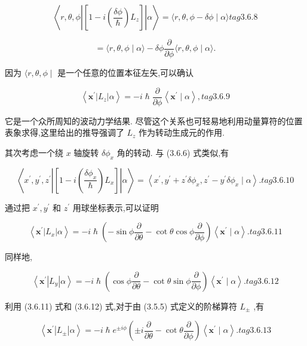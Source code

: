 $$
\left\langle {r,\theta ,\phi \left| \left\lbrack {1 - i\left( \frac{\delta \phi }{\hslash }\right) {L}_{z}}\right\rbrack \right| \alpha }\right\rangle = \langle r,\theta ,\phi - {\delta \phi } \mid \alpha \rangle tag{3.6.8}
$$

$$
= \langle r,\theta ,\phi \mid \alpha \rangle - {\delta \phi }\frac{\partial }{\partial \phi }\langle r,\theta ,\phi \mid \alpha \rangle .
$$

因为 $\langle r,\theta ,\phi \mid$ 是一个任意的位置本征左矢,可以确认

$$
\left\langle {{\mathbf{x}}^{\prime }\left| {L}_{z}\right| \alpha }\right\rangle = - i\hslash \frac{\partial }{\partial \phi }\left\langle {{\mathbf{x}}^{\prime } \mid \alpha }\right\rangle , tag{3.6.9}
$$

它是一个众所周知的波动力学结果. 尽管这个关系也可轻易地利用动量算符的位置表象求得,这里给出的推导强调了 ${L}_{z}$ 作为转动生成元的作用.

其次考虑一个绕 $x$ 轴旋转 $\delta {\phi }_{x}$ 角的转动. 与 (3.6.6) 式类似,有

$$
\left\langle {{x}^{\prime },{y}^{\prime },{z}^{\prime }\left| \left\lbrack {1 - i\left( \frac{\delta {\phi }_{x}}{\hslash }\right) {L}_{x}}\right\rbrack \right| \alpha }\right\rangle = \left\langle {{x}^{\prime },{y}^{\prime } + {z}^{\prime }\delta {\phi }_{x},{z}^{\prime } - {y}^{\prime }\delta {\phi }_{x} \mid \alpha }\right\rangle . tag{3. 6.10}
$$

通过把 ${x}^{\prime },{y}^{\prime }$ 和 ${z}^{\prime }$ 用球坐标表示,可以证明

$$
\left\langle {{\mathbf{x}}^{\prime }\left| {L}_{x}\right| \alpha }\right\rangle = - i\hslash \left( {-\sin \phi \frac{\partial }{\partial \theta } - \cot \theta \cos \phi \frac{\partial }{\partial \phi }}\right) \left\langle {{\mathbf{x}}^{\prime } \mid \alpha }\right\rangle . tag{3. 6.11}
$$

同样地,

$$
\left\langle {{\mathbf{x}}^{\prime }\left| {L}_{y}\right| \alpha }\right\rangle = - i\hslash \left( {\cos \phi \frac{\partial }{\partial \theta } - \cot \theta \sin \phi \frac{\partial }{\partial \phi }}\right) \left\langle {{\mathbf{x}}^{\prime } \mid \alpha }\right\rangle . tag{3. 6.12}
$$

利用 (3.6.11) 式和 (3.6.12) 式,对于由 (3.5.5) 式定义的阶梯算符 ${L}_{ \pm }$ ,有

$$
\left\langle {{\mathbf{x}}^{\prime }\left| {L}_{ \pm }\right| \alpha }\right\rangle = - i\hslash {e}^{\pm {i\phi }}\left( {\pm i\frac{\partial }{\partial \theta } - \cot \theta \frac{\partial }{\partial \phi }}\right) \left\langle {{\mathbf{x}}^{\prime } \mid \alpha }\right\rangle . tag{3. 6.13}
$$

